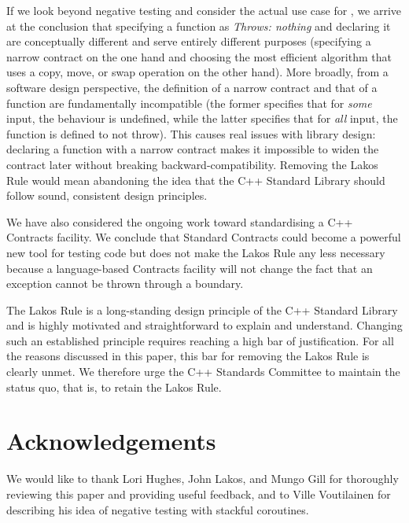 If we look beyond negative testing and consider the actual use case for , we arrive at the conclusion that specifying a function as \emph{Throws: nothing} and declaring it  are conceptually different and serve entirely different purposes (specifying a narrow contract on the one hand and choosing the most efficient algorithm that uses a copy, move, or swap operation on the other hand). More broadly, from a software design perspective, the definition of a narrow contract and that of a  function are fundamentally incompatible (the former specifies that for \emph{some} input, the behaviour is undefined, while the latter specifies that for \emph{all} input, the function is defined to not throw). This causes real issues with library design: declaring a function with a narrow contract  makes it impossible to widen the contract later without breaking backward-compatibility. Removing the Lakos Rule would mean abandoning the idea that the C++ Standard Library should follow sound, consistent design principles.

We have also considered the ongoing work toward standardising a C++ Contracts facility. We conclude that Standard Contracts could become a powerful new tool for testing code but does not make the Lakos Rule any less necessary because a language-based Contracts facility will not change the fact that an exception cannot be thrown through a  boundary.

The Lakos Rule is a long-standing design principle of the C++ Standard Library and is highly motivated and straightforward to explain and understand. Changing such an established principle requires reaching a high bar of justification. For all the reasons discussed in this paper, this bar for removing the Lakos Rule is clearly unmet. We therefore urge the C++ Standards Committee to maintain the status quo, that is, to retain the Lakos Rule.



\section*{Acknowledgements}

We would like to thank Lori Hughes, John Lakos, and Mungo Gill for thoroughly reviewing this paper and providing useful feedback, and to Ville Voutilainen for describing his idea of negative testing with stackful coroutines.

\renewcommand{\bibname}{References}




